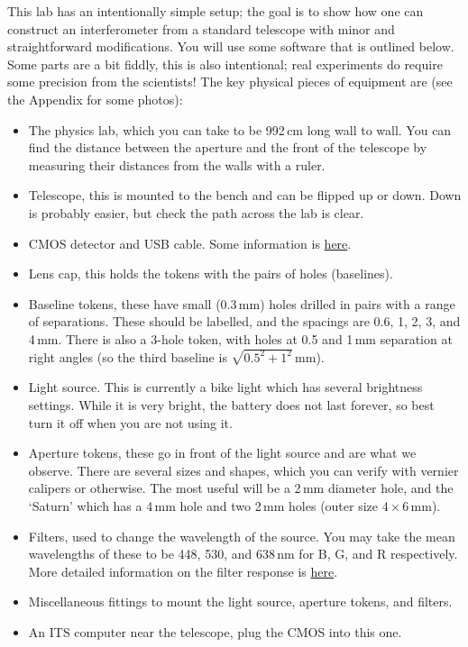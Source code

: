 \documentclass[11pt]{article}
\begin{document}
This lab has an intentionally simple setup; the goal is to show how one can construct an interferometer from a standard telescope with minor and straightforward modifications. You will use some software that is outlined below. Some parts are a bit fiddly, this is also intentional; real experiments do require some precision from the scientists! The key physical pieces of equipment are (see the Appendix for some photos):
\begin{itemize}
    \item The physics lab, which you can take to be 992\,cm long wall to wall. You can find the distance between the aperture and the front of the telescope by measuring their distances from the walls with a ruler.
    \item Telescope, this is mounted to the bench and can be flipped up or down. Down is probably easier, but check the path across the lab is clear.
    \item CMOS detector and USB cable. Some information is \href{https://www.qhyccd.com/qhy5l-ii-planetary-guiding-camera/}{here}.
    \item Lens cap, this holds the tokens with the pairs of holes (baselines).
    \item Baseline tokens, these have small (0.3\,mm) holes drilled in pairs with a range of separations. These should be labelled, and the spacings are 0.6, 1, 2, 3, and 4\,mm. There is also a 3-hole token, with holes at 0.5 and 1\,mm separation at right angles (so the third baseline is $\sqrt{0.5^2 + 1^2}$\,mm).
    \item Light source. This is currently a bike light which has several brightness settings. While it is very bright, the battery does not last forever, so best turn it off when you are not using it.
    \item Aperture tokens, these go in front of the light source and are what we observe. There are several sizes and shapes, which you can verify with vernier calipers or otherwise. The most useful will be a 2\,mm diameter hole, and the `Saturn' which has a 4\,mm hole and two 2\,mm holes (outer size $4 \times 6$\,mm).
    \item Filters, used to change the wavelength of the source. You may take the mean wavelengths of these to be 448, 530, and 638\,nm for B, G, and R respectively. More detailed information on the filter response is \href{https://www.firstlightoptics.com/rgb-filters-filter-sets/zwo-2-lrgb-filter-set.html}{here}.
    \item Miscellaneous fittings to mount the light source, aperture tokens, and filters.
    \item An ITS computer near the telescope, plug the CMOS into this one.
\end{itemize}
\end{document}
